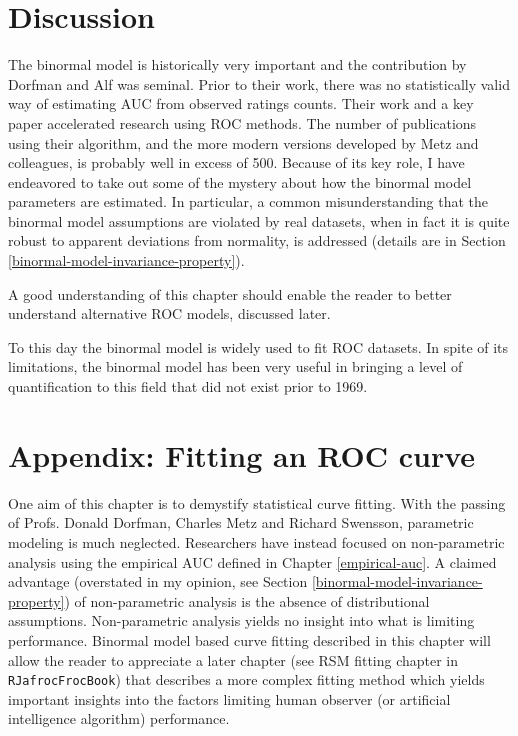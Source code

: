 \documentclass[
]{book}
\begin{document}
\hypertarget{binormal-model-discussion}{%
\section{Discussion}\label{binormal-model-discussion}}

The binormal model is historically very important and the contribution by Dorfman and Alf \citep{dorfman1969maximum} was seminal. Prior to their work, there was no statistically valid way of estimating AUC from observed ratings counts. Their work and a key paper \citep{RN1487} accelerated research using ROC methods. The number of publications using their algorithm, and the more modern versions developed by Metz and colleagues, is probably well in excess of 500. Because of its key role, I have endeavored to take out some of the mystery about how the binormal model parameters are estimated. In particular, a common misunderstanding that the binormal model assumptions are violated by real datasets, when in fact it is quite robust to apparent deviations from normality, is addressed (details are in Section \ref{binormal-model-invariance-property}).

A good understanding of this chapter should enable the reader to better understand alternative ROC models, discussed later.

To this day the binormal model is widely used to fit ROC datasets. In spite of its limitations, the binormal model has been very useful in bringing a level of quantification to this field that did not exist prior to 1969.

\hypertarget{binormal-model-curve-fitting}{%
\section{Appendix: Fitting an ROC curve}\label{binormal-model-curve-fitting}}

One aim of this chapter is to demystify statistical curve fitting. With the passing of Profs. Donald Dorfman, Charles Metz and Richard Swensson, parametric modeling is much neglected. Researchers have instead focused on non-parametric analysis using the empirical AUC defined in Chapter \ref{empirical-auc}. A claimed advantage (overstated in my opinion, see Section \ref{binormal-model-invariance-property}) of non-parametric analysis is the absence of distributional assumptions. Non-parametric analysis yields no insight into what is limiting performance. Binormal model based curve fitting described in this chapter will allow the reader to appreciate a later chapter (see RSM fitting chapter in \texttt{RJafrocFrocBook}) that describes a more complex fitting method which yields important insights into the factors limiting human observer (or artificial intelligence algorithm) performance.
\end{document}
